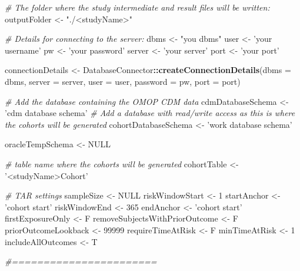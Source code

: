 \documentclass[
]{article}
\newenvironment{Shaded}{\begin{snugshade}}{\end{snugshade}}
\newcommand{\CommentTok}[1]{\textcolor[rgb]{0.56,0.35,0.01}{\textit{#1}}}
\newcommand{\DataTypeTok}[1]{\textcolor[rgb]{0.13,0.29,0.53}{#1}}
\newcommand{\DecValTok}[1]{\textcolor[rgb]{0.00,0.00,0.81}{#1}}
\newcommand{\KeywordTok}[1]{\textcolor[rgb]{0.13,0.29,0.53}{\textbf{#1}}}
\newcommand{\NormalTok}[1]{#1}
\newcommand{\OperatorTok}[1]{\textcolor[rgb]{0.81,0.36,0.00}{\textbf{#1}}}
\newcommand{\OtherTok}[1]{\textcolor[rgb]{0.56,0.35,0.01}{#1}}
\newcommand{\StringTok}[1]{\textcolor[rgb]{0.31,0.60,0.02}{#1}}
\begin{document}
\begin{Shaded}
\begin{Highlighting}[]
\CommentTok{# The folder where the study intermediate and result files will be written:}
\NormalTok{outputFolder <-}\StringTok{ "./<studyName>"}

\CommentTok{# Details for connecting to the server:}
\NormalTok{dbms <-}\StringTok{ "you dbms"}
\NormalTok{user <-}\StringTok{ 'your username'}
\NormalTok{pw <-}\StringTok{ 'your password'}
\NormalTok{server <-}\StringTok{ 'your server'}
\NormalTok{port <-}\StringTok{ 'your port'}

\NormalTok{connectionDetails <-}\StringTok{ }\NormalTok{DatabaseConnector}\OperatorTok{::}\KeywordTok{createConnectionDetails}\NormalTok{(}\DataTypeTok{dbms =}\NormalTok{ dbms,}
                                                                \DataTypeTok{server =}\NormalTok{ server,}
                                                                \DataTypeTok{user =}\NormalTok{ user,}
                                                                \DataTypeTok{password =}\NormalTok{ pw,}
                                                                \DataTypeTok{port =}\NormalTok{ port)}

\CommentTok{# Add the database containing the OMOP CDM data}
\NormalTok{cdmDatabaseSchema <-}\StringTok{ 'cdm database schema'}
\CommentTok{# Add a database with read/write access as this is where the cohorts will be generated}
\NormalTok{cohortDatabaseSchema <-}\StringTok{ 'work database schema'}

\NormalTok{oracleTempSchema <-}\StringTok{ }\OtherTok{NULL}

\CommentTok{# table name where the cohorts will be generated}
\NormalTok{cohortTable <-}\StringTok{ '<studyName>Cohort'}

\CommentTok{# TAR settings}
\NormalTok{sampleSize <-}\StringTok{ }\OtherTok{NULL}
\NormalTok{riskWindowStart <-}\StringTok{ }\DecValTok{1}
\NormalTok{startAnchor <-}\StringTok{ 'cohort start'}
\NormalTok{riskWindowEnd <-}\StringTok{ }\DecValTok{365}
\NormalTok{endAnchor <-}\StringTok{ 'cohort start'}
\NormalTok{firstExposureOnly <-}\StringTok{ }\NormalTok{F}
\NormalTok{removeSubjectsWithPriorOutcome <-}\StringTok{ }\NormalTok{F}
\NormalTok{priorOutcomeLookback <-}\StringTok{ }\DecValTok{99999}
\NormalTok{requireTimeAtRisk <-}\StringTok{ }\NormalTok{F}
\NormalTok{minTimeAtRisk <-}\StringTok{ }\DecValTok{1}
\NormalTok{includeAllOutcomes <-}\StringTok{ }\NormalTok{T}


\CommentTok{#=======================}


\end{Highlighting}
\end{Shaded}
\end{document}
